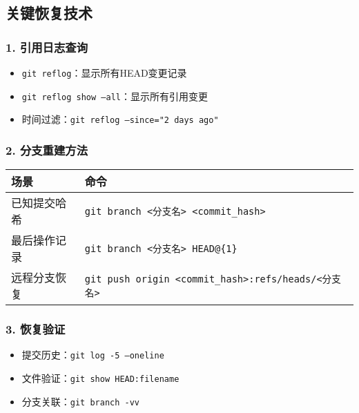 \subsection{关键恢复技术}
\subsubsection{1. 引用日志查询}
\begin{itemize}[leftmargin=*, nosep]
    \item \texttt{git reflog}：显示所有HEAD变更记录
    \item \texttt{git reflog show --all}：显示所有引用变更
    \item 时间过滤：\texttt{git reflog --since="2 days ago"}
\end{itemize}

\subsubsection{2. 分支重建方法}
\begin{center}
\begin{tabular}{@{}ll@{}}
    \toprule
    \textbf{场景} & \textbf{命令} \\
    \midrule
    已知提交哈希 & \texttt{git branch <分支名> <commit\_hash>} \\
    最后操作记录 & \texttt{git branch <分支名> HEAD@\{1\}} \\
    远程分支恢复 & \texttt{git push origin <commit\_hash>:refs/heads/<分支名>} \\
    \bottomrule
\end{tabular}
\end{center}

\subsubsection{3. 恢复验证}
\begin{itemize}[leftmargin=*, nosep]
    \item 提交历史：\texttt{git log -5 --oneline}
    \item 文件验证：\texttt{git show HEAD:filename}
    \item 分支关联：\texttt{git branch -vv}
\end{itemize}

